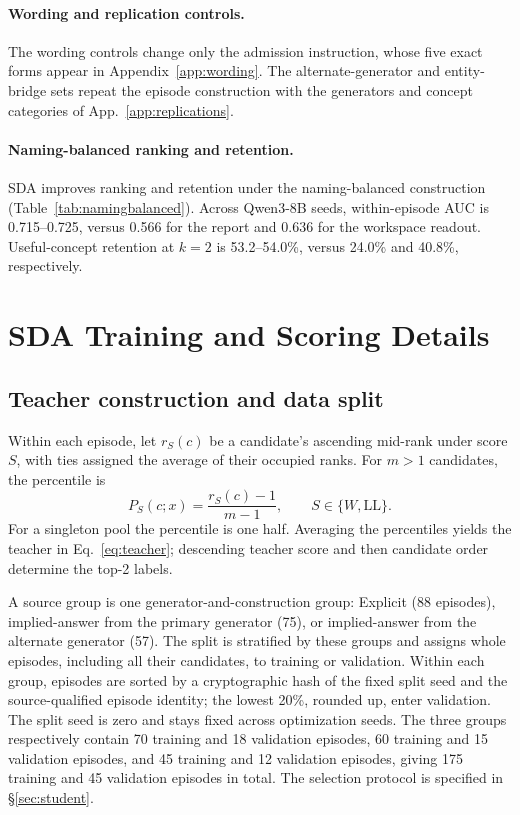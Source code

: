 \paragraph{Wording and replication controls.}
The wording controls change only the admission instruction, whose five
exact forms appear in Appendix~\ref{app:wording}. The alternate-generator
and entity-bridge sets repeat the episode construction with the
generators and concept categories of App.~\ref{app:replications}.

\paragraph{Naming-balanced ranking and retention.}
SDA improves ranking and retention under the naming-balanced construction
(Table~\ref{tab:namingbalanced}). Across Qwen3-8B seeds, within-episode
AUC is 0.715--0.725, versus 0.566 for the report and 0.636 for the
workspace readout. Useful-concept retention at $k=2$ is 53.2--54.0\%,
versus 24.0\% and 40.8\%, respectively.



\section{SDA Training and Scoring Details}
\label{app:training}

\subsection{Teacher construction and data split}

Within each episode, let $r_S(c)$ be a candidate's ascending mid-rank
under score $S$, with ties assigned the average of their occupied
ranks. For $m>1$ candidates, the percentile is
\begin{equation}
P_S(c;x)=\frac{r_S(c)-1}{m-1},
\qquad S\in\{W,\mathrm{LL}\}.
\label{eq:percentile}
\end{equation}
For a singleton pool the percentile is one half. Averaging the
percentiles yields the teacher in Eq.~\eqref{eq:teacher}; descending
teacher score and then candidate order determine the top-2 labels.

A source group is one generator-and-construction group: Explicit
(88 episodes), implied-answer from the primary generator (75), or
implied-answer from the alternate generator (57). The split is
stratified by these groups and assigns whole episodes, including all
their candidates, to training or validation. Within each group,
episodes are sorted by a cryptographic hash of the fixed split seed
and the source-qualified episode identity; the lowest 20\%, rounded
up, enter validation. The split seed is zero and stays fixed across
optimization seeds. The three groups respectively contain 70 training
and 18 validation episodes, 60 training and 15 validation episodes,
and 45 training and 12 validation episodes, giving 175 training and
45 validation episodes in total. The selection protocol is specified
in \S\ref{sec:student}.


